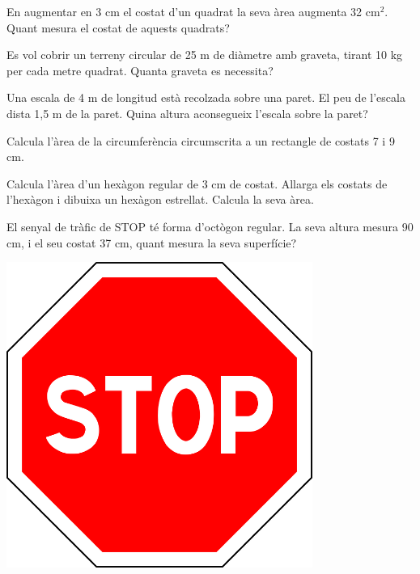 \begin{activitats}
\begin{mylist}
\exer  En augmentar en 3 cm el costat d'un quadrat la seva àrea augmenta 32 cm${}^{2}$. Quant mesura el costat de aquests quadrats?

\exer  Es vol cobrir un terreny circular de 25 m de diàmetre amb graveta, tirant 10 kg per cada metre quadrat. Quanta graveta es necessita?

\exer  Una escala de 4 m de longitud està recolzada sobre una paret. El peu de l'escala dista 1,5 m de la paret. Quina altura aconsegueix l'escala sobre la paret?

\exer  Calcula l'àrea de la circumferència circumscrita a un rectangle de costats 7 i 9 cm.

\exer  Calcula l'àrea d'un hexàgon regular de 3 cm de costat. Allarga els costats de l'hexàgon i dibuixa un hexàgon estrellat. Calcula la seva àrea.

\vspace{-1.5cm}
\exer \begin{minipage}[t]{0.3\textwidth}
	 El senyal de tràfic de STOP té forma d'octògon regular. La seva altura mesura 90 cm, i el seu costat 37 cm, quant mesura la seva superfície?
\end{minipage}
\begin{minipage}{0.15\textwidth}
	\centering
	\vspace{1.5cm}
	\includegraphics[width=0.75\textwidth]{img-09/stop}
\end{minipage}


\end{mylist}
\end{activitats}

